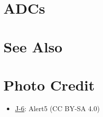 \section{ADCs}

\begin{adclist}
\end{adclist}

\section{See Also}
\begin{typelist}
\end{typelist}

\section{Photo Credit}
\begin{itemize}\raggedright
    \item \href{https://commons.wikimedia.org/wiki/File:Shenyang_J-6_(cropped).jpg}{J-6}: Alert5 (CC BY-SA 4.0)
\end{itemize}
